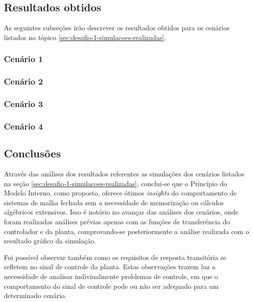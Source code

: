 \subsection{Resultados obtidos}
As seguintes subseções irão descrever os resultados obtidos para os cenários
listados no tópico \ref{sec:desafio-1-simulacoes-realizadas}.

\subsubsection{Cenário 1}
\label{subsub:cenario1}


\subsubsection{Cenário 2}
\label{subsub:cenario2}


\subsubsection{Cenário 3}
\label{subsub:cenario3}


\subsubsection{Cenário 4}
\label{subsub:cenario4}


\subsection{Conclusões}
Através das análises dos resultados referentes as simulações dos cenários
listados na seção \ref{sec:desafio-1-simulacoes-realizadas}, conclui-se que o Princípio do
Modelo Interno, como proposto, oferece ótimos \textit{insights} do comportamento
de sistemas de malha fechada sem a necessidade de memorização ou cálculos
algébricos extensivos. Isso é notório no avançar das análises dos cenários, onde
foram realizadas análises prévias apenas com as funções de transferência do
controlador e da planta, comprovando-se posteriormente a análise realizada com o
resultado gráfico da simulação.

Foi possível observar também como os requisitos de resposta transitória se
refletem no sinal de controle da planta. Estas observações trazem luz a
necessidade de analisar indiviualmente problemas de controle, em que o
comportamento do sinal de controle pode ou não ser adequado para um determinado
cenário.
